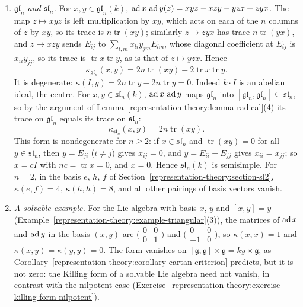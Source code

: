 \begin{example}\label{representation-theory:example-killing-forms}
\begin{enumerate}
\item \emph{$\mathfrak{gl}_n$ and $\mathfrak{sl}_n$.} For $x, y \in \mathfrak{gl}_n(k)$, $\operatorname{ad} x\,\operatorname{ad} y(z) = xyz - xzy - yzx + zyx$. The map $z \mapsto xyz$ is left multiplication by
$xy$, which acts on each of the $n$ columns of $z$ by $xy$, so its trace is $n\operatorname{tr}(xy)$; similarly $z \mapsto zyx$ has trace $n\operatorname{tr}(yx)$, and
$z \mapsto xzy$ sends $E_{ij}$ to $\sum_{l,m}x_{li}y_{jm}E_{lm}$, whose diagonal coefficient at $E_{ij}$ is $x_{ii}y_{jj}$, so its trace is
$\operatorname{tr}x\operatorname{tr}y$, as is that of $z \mapsto yzx$. Hence
\[
\kappa_{\mathfrak{gl}_n}(x, y) = 2n\operatorname{tr}(xy) - 2\operatorname{tr}x\operatorname{tr}y .
\]
It is degenerate: $\kappa(I, y) = 2n\operatorname{tr}y - 2n\operatorname{tr}y = 0$. Indeed $k \cdot I$ is an abelian ideal, the centre. For $x, y \in \mathfrak{sl}_n(k)$,
$\operatorname{ad} x\,\operatorname{ad} y$ maps $\mathfrak{gl}_n$ into $[\mathfrak{gl}_n, \mathfrak{gl}_n] \subseteq \mathfrak{sl}_n$, so by the argument of
Lemma~\ref{representation-theory:lemma-radical}(4) its trace on $\mathfrak{gl}_n$ equals its trace on $\mathfrak{sl}_n$:
\[
\kappa_{\mathfrak{sl}_n}(x, y) = 2n\operatorname{tr}(xy).
\]
This form is nondegenerate for $n \geq 2$: if $x \in \mathfrak{sl}_n$ and $\operatorname{tr}(xy) = 0$ for all $y \in \mathfrak{sl}_n$, then $y = E_{ji}$ ($i \neq j$) gives
$x_{ij} = 0$, and $y = E_{ii} - E_{jj}$ gives $x_{ii} = x_{jj}$; so $x = cI$ with $nc = \operatorname{tr}x = 0$, and $x = 0$. Hence $\mathfrak{sl}_n(k)$ is semisimple.
For $n = 2$, in the basis $e$, $h$, $f$ of Section~\ref{representation-theory:section-sl2}, $\kappa(e, f) = 4$, $\kappa(h, h) = 8$, and all other pairings of basis
vectors vanish.
\item \emph{A solvable example.} For the Lie algebra with basis $x$, $y$ and $[x, y] = y$ (Example~\ref{representation-theory:example-triangular}(3)), the matrices of
$\operatorname{ad} x$ and $\operatorname{ad} y$ in the basis $(x, y)$ are $\bigl(\begin{smallmatrix}0 & 0\\ 0 & 1\end{smallmatrix}\bigr)$ and $\bigl(\begin{smallmatrix}0 & 0\\ -1 & 0\end{smallmatrix}\bigr)$, so
$\kappa(x, x) = 1$ and $\kappa(x, y) = \kappa(y, y) = 0$. The form vanishes on $[\mathfrak{g}, \mathfrak{g}] \times \mathfrak{g} = ky \times \mathfrak{g}$, as
Corollary~\ref{representation-theory:corollary-cartan-criterion} predicts, but it is not zero: the Killing form of a solvable Lie algebra need not vanish, in contrast with the
nilpotent case (Exercise~\ref{representation-theory:exercise-killing-form-nilpotent}).
\end{enumerate}
\end{example}

